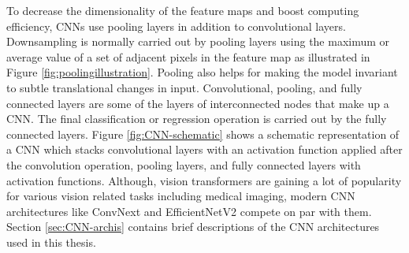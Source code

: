 To decrease the dimensionality of the feature maps and boost computing efficiency, CNNs use pooling layers in addition to convolutional layers. Downsampling is normally carried out by pooling layers using the maximum or average value of a set of adjacent pixels in the feature map as illustrated in Figure \ref{fig:poolingillustration}. Pooling also helps for making the model invariant to subtle translational changes in input. Convolutional, pooling, and fully connected layers are some of the layers of interconnected nodes that make up a CNN. The final classification or regression operation is carried out by the fully connected layers. Figure \ref{fig:CNN-schematic} shows a schematic representation of a CNN which stacks convolutional layers with an activation function applied after the convolution operation, pooling layers, and fully connected layers with activation functions.  Although, vision transformers \cite{Henry2022} are gaining a lot of popularity for various vision related tasks including medical imaging, modern CNN architectures like ConvNext \cite{liu2022convnet} and EfficientNetV2 \cite{EfficinetNetV2Ref} compete on par with them. Section \ref{sec:CNN-archis} contains brief descriptions of the CNN architectures used in this thesis.

